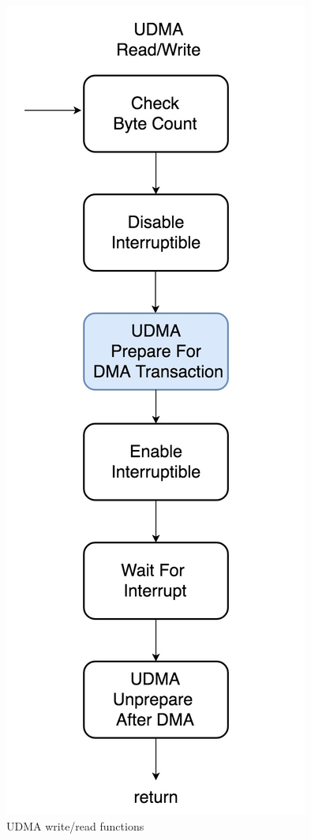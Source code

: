 \begin{figure}[!htb]
  \centering
  \includegraphics[scale=0.2]{images/udma_func.jpeg}
  \caption[UDMA write/read functions.]{UDMA write/read functions}
  \label{fig:UDMA write and read functions.}
\end{figure}

